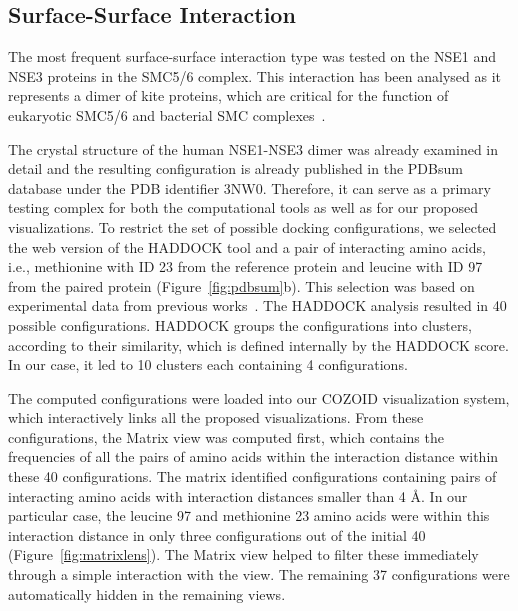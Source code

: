 \documentclass[twocolumn]{bmcart}%
\def\MatView {Matrix view\xspace}
\begin{document}
\subsection*{Surface-Surface Interaction}
The most frequent surface-surface interaction type was tested on the NSE1 and NSE3 proteins in the SMC5/6 complex. 
This interaction has been analysed as it represents a dimer of kite proteins, which are critical for the function of eukaryotic SMC5/6 and bacterial SMC complexes~\cite{Zabrady2016,Palecek2015,Doyle2010}. 

The crystal structure of the human NSE1-NSE3 dimer was already examined in detail and the resulting configuration is already published in the PDBsum database under the PDB identifier 3NW0. 
Therefore, it can serve as a primary testing complex for both the computational tools as well as for our proposed visualizations.
To restrict the set of possible docking configurations, we selected the web version of the HADDOCK tool and a pair of interacting amino acids, i.e., methionine with ID 23 from the reference protein and leucine with ID 97 from the paired protein (Figure~\ref{fig:pdbsum}b).
This selection was based on experimental data from previous works~\cite{Doyle2010,Hudson2011,Kozakova,Crabben}.
The HADDOCK analysis resulted in 40 possible configurations.
HADDOCK groups the configurations into clusters, according to their similarity, which is defined internally by the HADDOCK score.
In our case, it led to 10 clusters each containing 4 configurations.

The computed configurations were loaded into our COZOID visualization system, which interactively links all the proposed visualizations.
From these configurations, the \MatView was computed first, which contains the frequencies of all the pairs of amino acids within the interaction distance within these 40 configurations.
The matrix identified configurations containing pairs of interacting amino acids with interaction distances smaller than 4 \AA.
In our particular case, the leucine 97 and methionine 23 amino acids were within this interaction distance in only three configurations out of the initial 40 (Figure~\ref{fig:matrixlens}). 
The Matrix view helped to filter these immediately through a simple interaction with the view. 
The remaining 37 configurations were automatically hidden in the remaining views.
\end{document}
